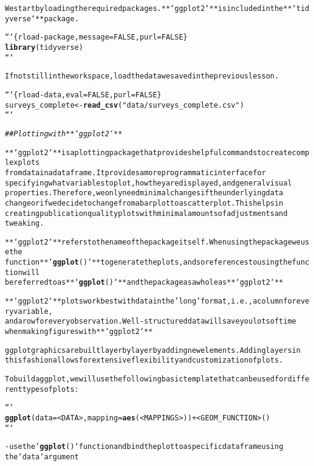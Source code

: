 \documentclass{article}\usepackage[]{graphicx}\usepackage[]{xcolor}
\makeatletter
\newcommand{\hlstr}[1]{\textcolor[rgb]{0.192,0.494,0.8}{#1}}%
\newcommand{\hlcom}[1]{\textcolor[rgb]{0.678,0.584,0.686}{\textit{#1}}}%
\newcommand{\hlkwd}[1]{\textcolor[rgb]{0.737,0.353,0.396}{\textbf{#1}}}%
\newenvironment{kframe}{%
 \def\at@end@of@kframe{}%
 \ifinner\ifhmode%
  \def\at@end@of@kframe{\end{minipage}}%
  \begin{minipage}{\columnwidth}%
 \fi\fi%
 \def\FrameCommand##1{\hskip\@totalleftmargin \hskip-\fboxsep
 \colorbox{shadecolor}{##1}\hskip-\fboxsep
     \hskip-\linewidth \hskip-\@totalleftmargin \hskip\columnwidth}%
 \MakeFramed {\advance\hsize-\width
   \@totalleftmargin\z@ \linewidth\hsize
   \@setminipage}}%
 {\par\unskip\endMakeFramed%
 \at@end@of@kframe}
\newenvironment{knitrout}{}{} %
\makeatother
\begin{document}
\begin{knitrout}
\color{fgcolor}\begin{kframe}
\begin{alltt}

We start by loading the required packages. **`ggplot2`** is included in the **`tidyverse`** package.

```\{r load-package, message=FALSE, purl=FALSE\}
\hlkwd{library}(tidyverse)
```

If not still in the workspace, load the data we saved in the previous lesson.


```\{r load-data, eval = FALSE, purl = FALSE\}
surveys_complete <- \hlkwd{read_csv}(\hlstr{"data/surveys_complete.csv"})
```

\hlcom{## Plotting with **`ggplot2`**}

**`ggplot2`** is a plotting package that provides helpful commands to create complex plots
from data in a data frame. It provides a more programmatic interface for
specifying what variables to plot, how they are displayed, and general visual
properties. Therefore, we only need minimal changes if the underlying data
change or if we decide to change from a bar plot to a scatterplot. This helps in
creating publication quality plots with minimal amounts of adjustments and
tweaking. 

**`ggplot2`** refers to the name of the package itself. When using the package we use the
function **`\hlkwd{ggplot}()`** to generate the plots, and so references to using the function will
be referred to as **`\hlkwd{ggplot}()`** and the package as a whole as **`ggplot2`** 

**`ggplot2`** plots work best with data in the \hlstr{'long'} format, i.e., a column for every variable,
and a row for every observation. Well-structured data will save you lots of time
when making figures with **`ggplot2`**

ggplot graphics are built layer by layer by adding new elements. Adding layers in
this fashion allows for extensive flexibility and customization of plots.

To build a ggplot, we will use the following basic template that can be used for different types of plots:

```
\hlkwd{ggplot}(data = <DATA>, mapping = \hlkwd{aes}(<MAPPINGS>)) +  <GEOM_FUNCTION>()
```

- use the `\hlkwd{ggplot}()` function and bind the plot to a specific data frame using
  the `data` argument


\end{alltt}
\end{kframe}
\end{knitrout}
\end{document}
